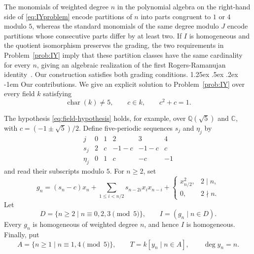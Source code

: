 \documentclass[11pt,reqno]{amsart}
\makeatletter
\theoremstyle{definition}
\theoremstyle{remark}
\theoremstyle{plain}
\renewcommand{\paragraph}{%
  \@startsection{paragraph}{4}{\z@}%
    {1.25ex \@plus .5ex \@minus .2ex}%
    {-1em}%
    {\normalfont\normalsize\bfseries}}
\makeatother
\begin{document}
The monomials of weighted degree \(n\) in the polynomial algebra on
the right-hand side of \eqref{eq:IYproblem} encode partitions of \(n\)
into parts congruent to \(1\) or \(4\) modulo \(5\), whereas the
standard monomials of the same degree modulo \(J\) encode partitions
whose consecutive parts differ by at least two. If \(I\) is
homogeneous and the quotient isomorphism preserves the grading,
the two requirements in Problem~\ref{prob:IY} imply that these
partition classes have the same cardinality for every \(n\),
giving an algebraic realization of the first Rogers-Ramanujan
identity~\cite{Andrews1998}. Our construction satisfies both
grading conditions.
\paragraph{Our contributions.}
We give an explicit solution to Problem~\ref{prob:IY} over every field
\(k\) satisfying
\begin{equation}\label{eq:field-hypothesis}
  \operatorname{char}(k)\neq5,
  \qquad
  c\in k,
  \qquad
  c^2+c=1.
\end{equation}




The hypothesis \eqref{eq:field-hypothesis} holds, for example, over
\(\mathbb Q(\sqrt5)\) and \(\mathbb C\), with
\(c=(-1\pm\sqrt5)/2\).  Define five-periodic sequences \(s_j\) and
\(\eta_j\) by
\begin{equation}\label{eq:periodic-data}
\begin{array}{c|ccccc}
j      &0&1&2&3&4\\ \hline
s_j    &2&c&-1-c&-1-c&c\\
\eta_j &0&1&c&-c&-1
\end{array}
\end{equation}
and read their subscripts modulo \(5\).  For \(n\geq2\), set
\begin{equation}\label{eq:gn-definition}
g_n=(s_n-c)x_n+
\sum_{1\leq i<n/2}s_{n-2i}x_ix_{n-i}
+\begin{cases}
x_{n/2}^2,&2\mid n,\\
0,&2\nmid n.
\end{cases}
\end{equation}
Let
\begin{equation}\label{eq:D-I-definition}
  D=\{n\geq2\mid n\equiv0,2,3\pmod5\},
  \qquad
  I=(g_n\mid n\in D).
\end{equation}
Every \(g_n\) is homogeneous of weighted degree \(n\), and hence \(I\)
is homogeneous.  Finally, put
\[
  A=\{n\geq1\mid n\equiv1,4\pmod5\},
  \qquad
  T=k[y_n\mid n\in A],
  \qquad
  \deg y_n=n.
\]
\end{document}
